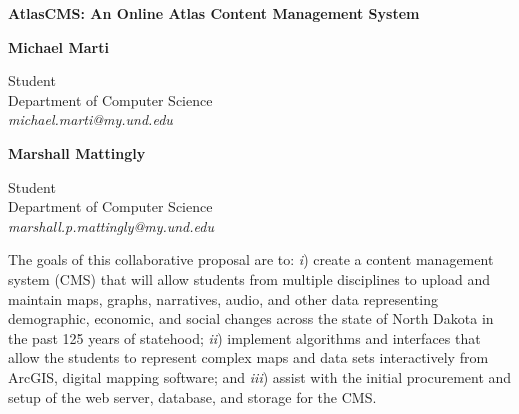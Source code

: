 \documentclass[12pt]{article}
\begin{document}
\pagestyle{empty}
\renewcommand{\thesection}{\Alph{section}}

\setlength{\parsep}{5pt}
\setlength{\parskip}{5pt plus 2pt minus 1pt}

\noindent
\begin{center}
{\large\bf AtlasCMS: An Online Atlas Content Management System}
\end{center}

\begin{center}
\begin{minipage}{0.43\linewidth}
\begin{center}
{\bf Michael Marti}\\
\begin{small}
Student\\
Department of Computer Science\\
{\it michael.marti@my.und.edu}
\end{small}
\end{center}
\end{minipage}
\begin{minipage}{0.43\linewidth}
\begin{center}
{\bf Marshall Mattingly}\\
\begin{small}
Student\\
Department of Computer Science\\
{\it marshall.p.mattingly@my.und.edu}
\end{small}
\end{center}
\end{minipage}
\end{center}

\noindent
The goals of this collaborative proposal are to: {\it i}) create a content management system (CMS) that will allow students from multiple disciplines to upload and maintain maps, graphs, narratives, audio, and other data representing demographic, economic, and social changes across the state of North Dakota in the past 125 years of statehood; {\it ii}) implement algorithms and interfaces that allow the students to represent complex maps and data sets interactively from ArcGIS, digital mapping software; and {\it iii}) assist with the initial procurement and setup of the web server, database, and storage for the CMS.
\end{document}
